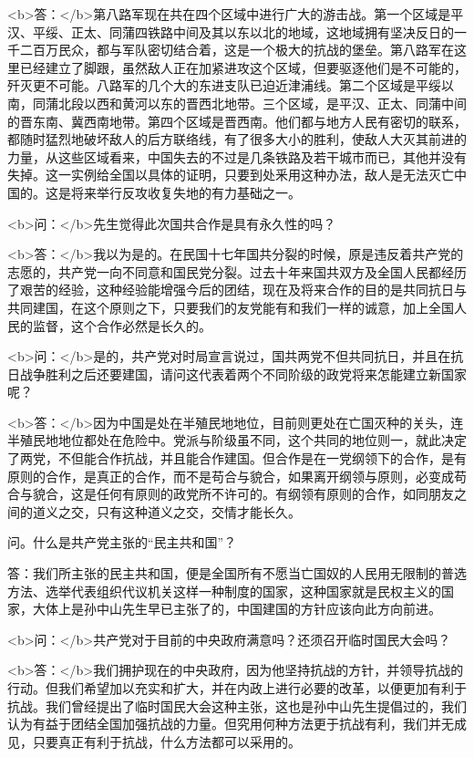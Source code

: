 <b>答：</b>第八路军现在共在四个区域中进行广大的游击战。第一个区域是平汉、平绥、正太、同蒲四铁路中间及其以东以北的地域，这地域拥有坚决反日的一千二百万民众，都与军队密切结合着，这是一个极大的抗战的堡垒。第八路军在这里已经建立了脚跟，虽然敌人正在加紧进攻这个区域，但要驱逐他们是不可能的，歼灭更不可能。八路军的几个大的东进支队已迫近津浦线。第二个区域是平绥以南，同蒲北段以西和黄河以东的晋西北地带。三个区域，是平汉、正太、同蒲中间的晋东南、冀西南地带。第四个区域是晋西南。他们都与地方人民有密切的联系，都随时猛烈地破坏敌人的后方联络线，有了很多大小的胜利，使敌人大灭其前进的力量，从这些区域看来，中国失去的不过是几条铁路及若干城市而已，其他并没有失掉。这一实例给全国以具体的证明，只要到处釆用这种办法，敌人是无法灭亡中国的。这是将来举行反攻收复失地的有力基础之一。

<b>问：</b>先生觉得此次国共合作是具有永久性的吗？

<b>答：</b>我以为是的。在民国十七年国共分裂的时候，原是违反着共产党的志愿的，共产党一向不同意和国民党分裂。过去十年来国共双方及全国人民都经历了艰苦的经验，这种经验能增强今后的团结，现在及将来合作的目的是共同抗日与共同建国，在这个原则之下，只要我们的友党能有和我们一样的诚意，加上全国人民的监督，这个合作必然是长久的。

<b>问：</b>是的，共产党对时局宣言说过，国共两党不但共同抗日，并且在抗日战争胜利之后还要建国，请问这代表着两个不同阶级的政党将来怎能建立新国家呢？

<b>答：</b>因为中国是处在半殖民地地位，目前则更处在亡国灭种的关头，连半殖民地地位都处在危险中。党派与阶级虽不同，这个共同的地位则一，就此决定了两党，不但能合作抗战，并且能合作建国。但合作是在一党纲领下的合作，是有原则的合作，是真正的合作，而不是苟合与貌合，如果离开纲领与原则，必变成苟合与貌合，这是任何有原则的政党所不许可的。有纲领有原则的合作，如同朋友之间的道义之交，只有这种道义之交，交情才能长久。

问。什么是共产党主张的“民主共和国”？

答：我们所主张的民主共和国，便是全国所有不愿当亡国奴的人民用无限制的普选方法、选举代表组织代议机关这样一种制度的国家，这种国家就是民权主义的国家，大体上是孙中山先生早已主张了的，中国建国的方针应该向此方向前进。

<b>问：</b>共产党对于目前的中央政府满意吗？还须召开临时国民大会吗？

<b>答：</b>我们拥护现在的中央政府，因为他坚持抗战的方针，并领导抗战的行动。但我们希望加以充实和扩大，并在内政上进行必要的改革，以便更加有利于抗战。我们曾经提出了临时国民大会这种主张，这也是孙中山先生提倡过的，我们认为有益于团结全国加强抗战的力量。但究用何种方法更于抗战有利，我们并无成见，只要真正有利于抗战，什么方法都可以采用的。

